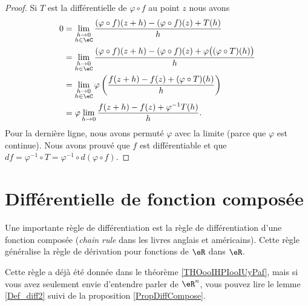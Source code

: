 \begin{proof}
	Si \( T\) est la différentielle de \( \varphi\circ f\) au point \( z\) nous avons
	\begin{subequations}
		\begin{align}
			0 & =\lim_{\substack{h\to 0                                            \\h\in \eC}}\frac{ (\varphi\circ f)(z+h)-(\varphi\circ f)(z)+T(h) }{ h }\\
			  & = \lim_{\substack{h\to 0                                           \\h\in \eC}}\frac{ (\varphi\circ f)(z+h)-(\varphi\circ f)(z)+\varphi\big( (\varphi\circ T)(h) \big) }{ h }\\
			  & = \lim_{\substack{h\to 0                                           \\h\in \eC}}\varphi\left( \frac{ f(z+h)- f(z)+ (\varphi\circ T)(h)  }{ h }\right)\\
			  & =\varphi\lim_{h\to 0} \frac{ f(z+h)-f(z)+\varphi^{-1} T(h) }{ h }.
		\end{align}
	\end{subequations}
	Pour la dernière ligne, nous avons permuté \( \varphi\) avec la limite (parce que \( \varphi\) est continue). Nous avons prouvé que \( f\) est différentiable et que \( df=\varphi^{-1}\circ T=\varphi^{-1}\circ d(\varphi\circ f)\).
\end{proof}

\section{Différentielle de fonction composée}

Une importante règle de différentiation est la règle de différentiation d'une fonction composée (\emph{chain rule} dans les livres anglais et américains). Cette règle généralise la règle de dérivation pour fonctions de \( \eR\) dans \( \eR\).

Cette règle a déjà été donnée dans le théorème \ref{THOooIHPIooIUyPaf}, mais si vous avez seulement envie d'entendre parler de \( \eR^n\), vous pouvez lire le lemme \ref{Def_diff2} suivi de la proposition \ref{PropDiffCompose}.

